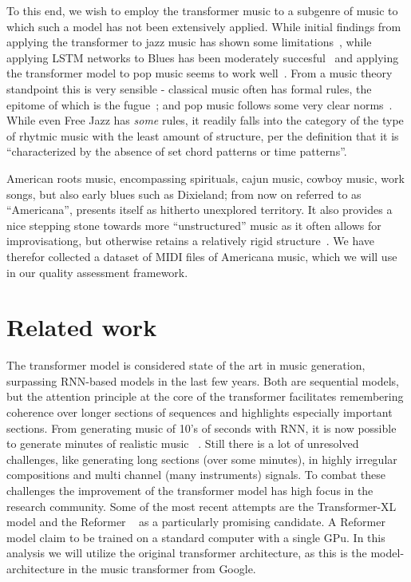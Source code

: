 \documentclass{IEEEtran}
\begin{document}
        To this end, we wish to employ the transformer music to a subgenre of music   
        to which such a model has not been extensively applied.
        While initial findings from applying the transformer to jazz music has shown 
        some limitations~\cite{wu2020jazz}, while applying LSTM networks to Blues has 
        been moderately succesful~\cite{eck2002bluesLSTM} and applying the transformer 
        model to pop music seems to work well~\cite{huang2020pop}.
        From a music theory standpoint this is very sensible - classical music often has 
        formal rules, the epitome of which is the fugue~\cite{giraud2015computational};
        and pop music follows some very clear norms~\cite{hennion1983production}. While 
        even Free Jazz has \emph{some} rules, it readily falls into the category of the 
        type of rhytmic music with the least amount of structure, per the definition
        that it is ``characterized by the absence of set chord patterns or
        time patterns''\cite{FreeJazz}.

        American roots music, encompassing spirituals, cajun music, cowboy music, work songs,
        but also early blues such as Dixieland; from now on referred to as ``Americana'', presents 
        itself as hitherto unexplored territory. It also provides a nice stepping stone
        towards more ``unstructured'' music as it often allows for improvisationg, but 
        otherwise retains a relatively rigid structure~\cite{libcong}.
        We have therefor collected a dataset of MIDI files of Americana music, which we
        will use in our quality assessment framework.

    \section{Related work}
       The transformer model is considered state of the art in music generation,
       surpassing RNN-based models in the last few years. Both are sequential models,
       but the attention principle at the core of the transformer facilitates
       remembering coherence over longer sections of sequences and highlights
       especially important sections. From generating music of 10's of seconds with RNN, it is now possible to generate minutes of realistic music ~\cite{huang2018music}. Still there is a lot of unresolved challenges, like generating long sections (over some minutes), in highly irregular compositions
       and multi channel (many instruments) signals. To combat these challenges the
       improvement of the transformer model has high focus in the research community.
       Some of the most recent attempts are the Transformer-XL ~\cite{dai2019transformerxl} 
       model and the Reformer ~\cite{kitaev2020reformer} as a particularly promising candidate. A Reformer model claim to be trained on a standard computer with a single GPu. In this analysis we will utilize the original transformer architecture, as this is the model-architecture in the music transformer from Google.
\end{document}
